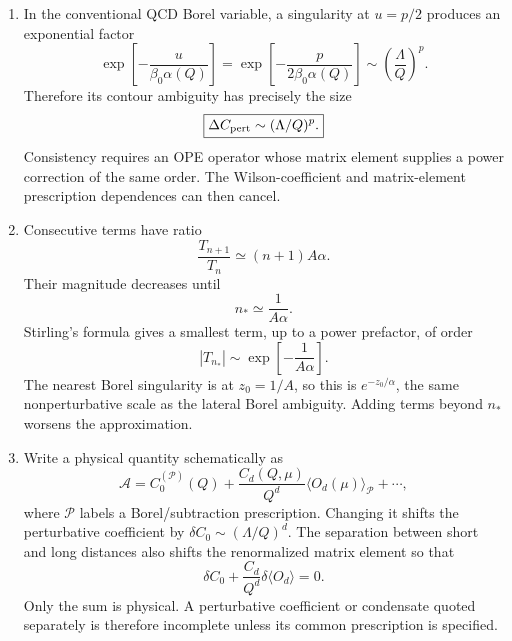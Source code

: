 \begin{enumerate}
  \begin{enumerate}
    \item[(a)]
    In the conventional QCD Borel variable, a singularity at \(u=p/2\)
    produces an exponential factor
    \[
      \exp\!\left[-\frac{u}{\beta_0\alpha(Q)}\right]
        =\exp\!\left[-\frac{p}{2\beta_0\alpha(Q)}\right]
        \sim\left(\frac{\Lambda}{Q}\right)^p.
    \]
    Therefore its contour ambiguity has precisely the size
    \[
      \boxed{\Delta C_{\rm pert}\sim(\Lambda/Q)^p.}
    \]
    Consistency requires an OPE operator whose matrix element supplies a
    power correction of the same order.  The Wilson-coefficient and
    matrix-element prescription dependences can then cancel.
    \item[(b)]
    Consecutive terms have ratio
    \[
      \frac{T_{n+1}}{T_n}\simeq(n+1)A\alpha.
    \]
    Their magnitude decreases until
    \[
      \boxed{n_*\simeq\frac1{A\alpha}.}
    \]
    Stirling's formula gives a smallest term, up to a power prefactor, of
    order
    \[
      |T_{n_*}|\sim
        \exp\!\left[-\frac1{A\alpha}\right].
    \]
    The nearest Borel singularity is at \(z_0=1/A\), so this is
    \(e^{-z_0/\alpha}\), the same nonperturbative scale as the lateral
    Borel ambiguity.  Adding terms beyond \(n_*\) worsens the approximation.
    \item[(c)]
    Write a physical quantity schematically as
    \[
      \mathcal A=C_0^{(\mathcal P)}(Q)
        +\frac{C_d(Q,\mu)}{Q^d}
         \langle O_d(\mu)\rangle_{\mathcal P}+\cdots,
    \]
    where \(\mathcal P\) labels a Borel/subtraction prescription.  Changing
    it shifts the perturbative coefficient by
    \(\delta C_0\sim(\Lambda/Q)^d\).  The separation between short and long
    distances also shifts the renormalized matrix element so that
    \[
      \boxed{\delta C_0+
        \frac{C_d}{Q^d}\delta\langle O_d\rangle=0.}
    \]
    Only the sum is physical.  A perturbative coefficient or condensate
    quoted separately is therefore incomplete unless its common
    prescription is specified.
  \end{enumerate}

\end{enumerate}
